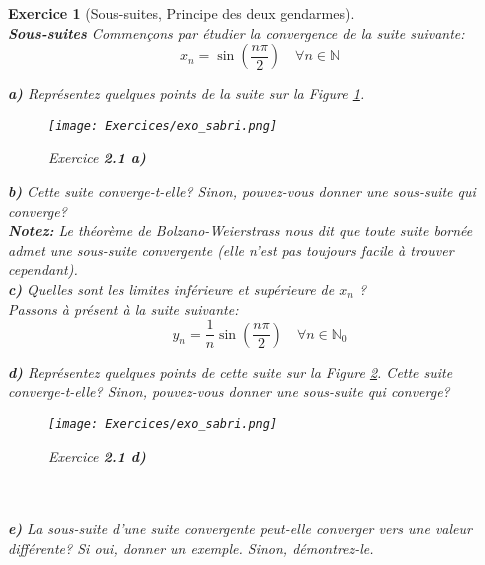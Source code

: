 \documentclass{article}
\newcommand{\Nn}{{\mathbb{N}}}
\theoremstyle{exercice}
\newtheorem{exercice}{Exercice}
\begin{document}
\begin{exercice}[Sous-suites, Principe des deux gendarmes]
\\ \newline
\textbf{Sous-suites}
Commençons par étudier la convergence de la suite suivante:
\begin{equation}
    x_n = \sin(\frac{n \pi}{2}) \quad \forall n\in \Nn
\end{equation}

\textbf{a)} Représentez quelques points de la suite sur la Figure \ref{fig:exo2.1a}.\\

\begin{figure}[H]
    \centering
    \texttt{[image: Exercices/exo\_sabri.png]}
    \caption{Exercice \textbf{2.1 a)}}
    \label{fig:exo2.1a}
\end{figure}

\textbf{b)} Cette suite converge-t-elle? Sinon, pouvez-vous donner une sous-suite qui converge? \\
\textbf{Notez:} Le théorème de Bolzano-Weierstrass nous dit que toute suite bornée admet une sous-suite convergente (elle n'est pas toujours facile à trouver cependant). \\

\textbf{c)} Quelles sont les limites inférieure et supérieure de $x_n$ ? \\

Passons à présent à la suite suivante:
\begin{equation}
    y_n = \frac{1}{n} \sin(\frac{n \pi}{2}) \quad \forall n\in \Nn_0
    \label{exo_sous_suite}
\end{equation}

\textbf{d)} Représentez quelques points de cette suite sur la Figure \ref{fig:exo2.1d}. Cette suite converge-t-elle? Sinon, pouvez-vous donner une sous-suite qui converge? \\

\begin{figure}[H]
    \centering
    \texttt{[image: Exercices/exo\_sabri.png]}
    \caption{Exercice \textbf{2.1 d)}}
    \label{fig:exo2.1d}
\end{figure}\\ \\

\textbf{e)} La sous-suite d'une suite convergente peut-elle converger vers une valeur différente? Si oui, donner un exemple. Sinon, démontrez-le.\\ \newline


\end{exercice}
\end{document}
